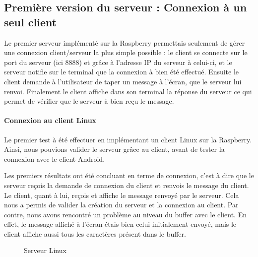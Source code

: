 \documentclass[a4paper,10pt]{article}
\begin{document}
\subsection{Première version du serveur : Connexion à un seul client}

Le premier serveur implémenté sur la Raspberry permettais seulement de gérer une connexion client/serveur la plus simple possible : le client se connecte sur le port du serveur (ici 8888) et grâce à l'adresse IP du serveur à celui-ci, et le serveur notifie sur le terminal que la connexion à bien été effectué. Ensuite le client demande à l'utilisateur de taper un message à l'écran, que le serveur lui renvoi. Finalement le client affiche dans son terminal la réponse du serveur ce qui permet de vérifier que le serveur à bien reçu le message.

\paragraph{Connexion au client Linux}

Le premier test à été effectuer en implémentant un client Linux sur la Raspberry. Ainsi, nous pouvions valider le serveur grâce au client, avant de tester la connexion avec le client Android.

Les premiers résultats ont été concluant en terme de connexion, c'est à dire que le serveur reçois la demande de connexion du client et renvois le message du client. Le client, quant à lui, reçois et affiche le message renvoyé par le serveur. Cela nous a permis de valider la création du serveur et la connexion au client. Par contre, nous avons rencontré un problème au niveau du buffer avec le client. En effet, le message affiché à l'écran étais bien celui initialement envoyé, mais le client affiche aussi tous les caractères présent dans le buffer.

\begin{figure}[h]
  \begin{center}
    \caption{Serveur Linux}
    \label{fig:serv_simple}
  \end{center}
\end{figure}
\end{document}
